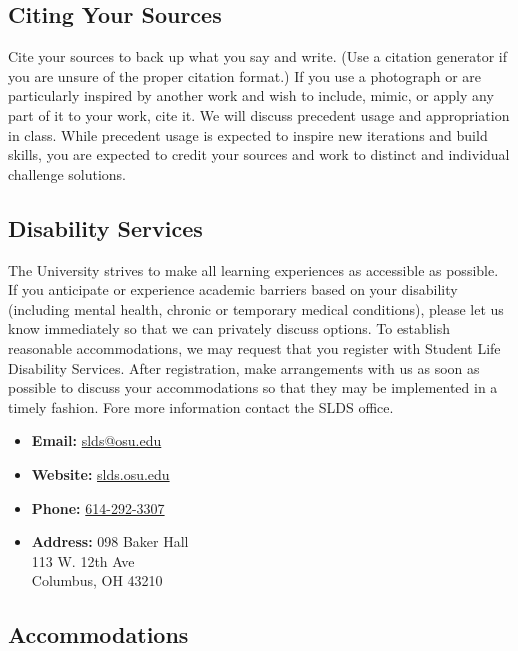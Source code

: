 \subsection{Citing Your Sources}

Cite your sources to back up what you say and write. (Use a citation generator if you are unsure of the proper citation format.) If you use a photograph or are particularly inspired by another work and wish to include, mimic, or apply any part of it to your work, cite it. We will discuss precedent usage and appropriation in class. While precedent usage is expected to inspire new iterations and build skills, you are expected to credit your sources and work to distinct and individual challenge solutions.

\subsection{Disability Services}

The University strives to make all learning experiences as accessible as possible. If you anticipate or experience academic barriers based on your disability (including mental health, chronic or temporary medical conditions), please let us know immediately so that we can privately discuss options. To establish reasonable accommodations, we may request that you register with Student Life Disability Services. After registration, make arrangements with us as soon as possible to discuss your accommodations so that they may be implemented in a timely fashion. Fore more information contact the SLDS office.

\begin{itemize}
      \tightlist
      \item \textbf{Email:} \href{mailto:slds@osu.edu}{slds@osu.edu}
      \item \textbf{Website:} \href{http://www.ods.ohio-state.edu/}{slds.osu.edu}
      \item \textbf{Phone:} \href{tel:6142923307}{614-292-3307}
      \item \textbf{Address:} 098 Baker Hall\\%
            \hspace*{4.8em}113 W. 12th Ave\\%
            \hspace*{4.8em}Columbus, OH 43210
\end{itemize}




\subsection{Accommodations}

